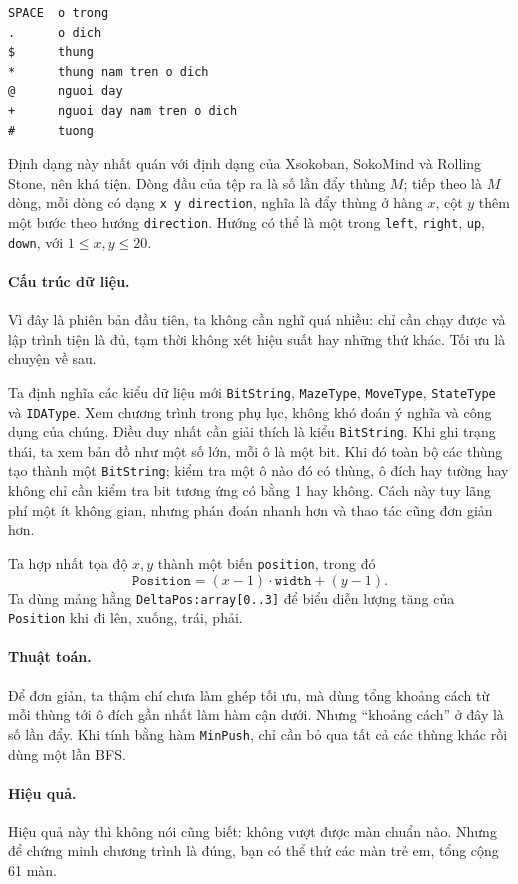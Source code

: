 \documentclass[11pt]{article}
\begin{document}
\begin{verbatim}
SPACE  o trong
.      o dich
$      thung
*      thung nam tren o dich
@      nguoi day
+      nguoi day nam tren o dich
#      tuong
\end{verbatim}

Định dạng này nhất quán với định dạng của Xsokoban, SokoMind và Rolling
Stone, nên khá tiện. Dòng đầu của tệp ra là số lần đẩy thùng \(M\); tiếp theo
là \(M\) dòng, mỗi dòng có dạng \texttt{x y direction}, nghĩa là đẩy thùng ở
hàng \(x\), cột \(y\) thêm một bước theo hướng \texttt{direction}. Hướng có
thể là một trong \texttt{left}, \texttt{right}, \texttt{up}, \texttt{down},
với \(1\le x,y\le20\).

\paragraph{Cấu trúc dữ liệu.}
Vì đây là phiên bản đầu tiên, ta không cần nghĩ quá nhiều: chỉ cần chạy được
và lập trình tiện là đủ, tạm thời không xét hiệu suất hay những thứ khác. Tối
ưu là chuyện về sau.

Ta định nghĩa các kiểu dữ liệu mới \texttt{BitString}, \texttt{MazeType},
\texttt{MoveType}, \texttt{StateType} và \texttt{IDAType}. Xem chương trình
trong phụ lục, không khó đoán ý nghĩa và công dụng của chúng. Điều duy nhất
cần giải thích là kiểu \texttt{BitString}. Khi ghi trạng thái, ta xem bản đồ
như một số lớn, mỗi ô là một bit. Khi đó toàn bộ các thùng tạo thành một
\texttt{BitString}; kiểm tra một ô nào đó có thùng, ô đích hay tường hay
không chỉ cần kiểm tra bit tương ứng có bằng 1 hay không. Cách này tuy lãng
phí một ít không gian, nhưng phán đoán nhanh hơn và thao tác cũng đơn giản
hơn.

Ta hợp nhất tọa độ \(x,y\) thành một biến \texttt{position}, trong đó
\[
  \texttt{Position}=(x-1)\cdot \texttt{width}+(y-1).
\]
Ta dùng mảng hằng \texttt{DeltaPos:array[0..3]} để biểu diễn lượng tăng của
\texttt{Position} khi đi lên, xuống, trái, phải.

\paragraph{Thuật toán.}
Để đơn giản, ta thậm chí chưa làm ghép tối ưu, mà dùng tổng khoảng cách từ
mỗi thùng tới ô đích gần nhất làm hàm cận dưới. Nhưng ``khoảng cách'' ở đây
là số lần đẩy. Khi tính bằng hàm \texttt{MinPush}, chỉ cần bỏ qua tất cả các
thùng khác rồi dùng một lần BFS.

\paragraph{Hiệu quả.}
Hiệu quả này thì không nói cũng biết: không vượt được màn chuẩn nào. Nhưng để
chứng minh chương trình là đúng, bạn có thể thử các màn trẻ em, tổng cộng 61
màn.
\end{document}
